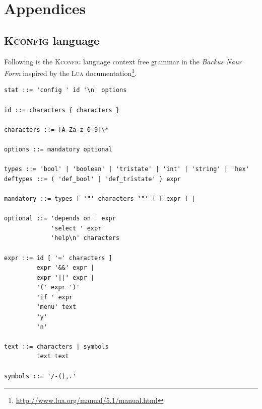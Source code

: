 \documentclass[a4paper,11pt]{report}
\newcommand{\f}{\footnote{\fn}}
\begin{document}
            \chapter{Appendices}


            \section{\textsc{Kconfig} language}
            \label{app:kconfig}

            \def \fn {\url{http://www.lua.org/manual/5.1/manual.html}}

Following is the \textsc{Kconfig} language context free grammar in the 
\emph{Backus Naur Form} inspired by the \textsc{Lua} documentation\f.

\begin{verbatim}
stat ::= 'config ' id '\n' options

id ::= characters { characters }

characters ::= [A-Za-z_0-9]\*

options ::= mandatory optional

types ::= 'bool' | 'boolean' | 'tristate' | 'int' | 'string' | 'hex'
deftypes ::= ( 'def_bool' | 'def_tristate' ) expr

mandatory ::= types [ '"' characters '"' ] [ expr ] |

optional ::= 'depends on ' expr
             'select ' expr
             'help\n' characters

expr ::= id [ '=' characters ] 
         expr '&&' expr |
         expr '||' expr |
         '(' expr ')'
         'if ' expr
         'menu' text
         'y'
         'n'

text ::= characters | symbols 
         text text

symbols ::= '/-(),.'

\end{verbatim}


\end{document}
